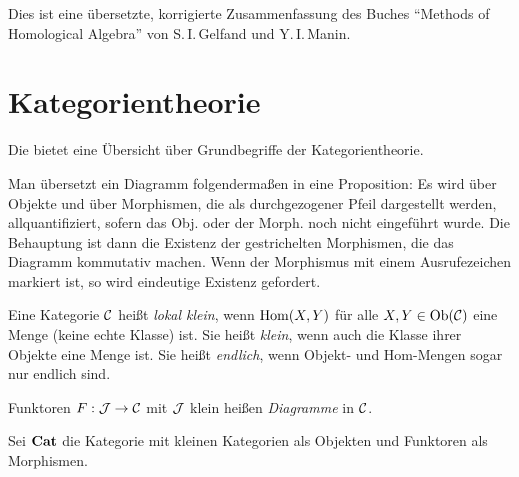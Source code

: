 \documentclass{cheat-sheet}
\begin{document}

Dies ist eine übersetzte, korrigierte Zusammenfassung des Buches "`Methods of Homological Algebra"' von S.\,I.\,Gelfand und Y.\,I.\,Manin.



\section{Kategorientheorie}

\begin{bem}
  Die  bietet eine Übersicht über Grundbegriffe der Kategorientheorie.
\end{bem}

\begin{konv}
  Man übersetzt ein Diagramm folgendermaßen in eine Proposition:
  Es wird über Objekte und über Morphismen, die als durchgezogener Pfeil dargestellt werden, allquantifiziert, sofern das Obj. oder der Morph. noch nicht eingeführt wurde.
  Die Behauptung ist dann die Existenz der gestrichelten Morphismen, die das Diagramm kommutativ machen. Wenn der Morphismus mit einem Ausrufezeichen markiert ist, so wird eindeutige Existenz gefordert.
\end{konv}

\begin{defn}
  Eine Kategorie $\mathcal{C}$ heißt \emph{lokal klein}, wenn $\operatorname{Hom}(X, Y)$ für alle $X, Y \in \operatorname{Ob}(\mathcal{C})$ eine Menge (keine echte Klasse) ist.
  Sie heißt \emph{klein}, wenn auch die Klasse ihrer Objekte eine Menge ist.
  Sie heißt \emph{endlich}, wenn Objekt- und Hom-Mengen sogar nur endlich sind.
\end{defn}

\begin{defn}
  Funktoren $F : \mathcal{J} \to \mathcal{C}$ mit $\mathcal{J}$ klein heißen \emph{Diagramme} in $\mathcal{C}$.
\end{defn}

\begin{defn}
  Sei $\mathbf{Cat}$ die Kategorie mit kleinen Kategorien als Objekten und Funktoren als Morphismen.
\end{defn}
\end{document}
